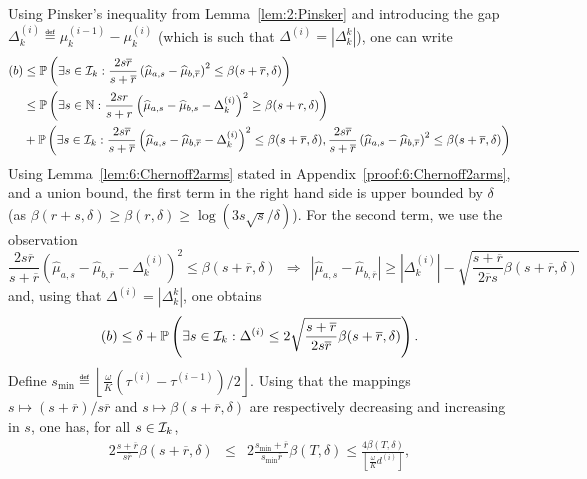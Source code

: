Using Pinsker's inequality from Lemma~\ref{lem:2:Pinsker} and introducing the gap $\Delta_k^{(i)} \eqdef \mu_k^{(i-1)} - {\mu}_k^{(i)}$ (which is such that $\Delta^{(i)} = |\Delta_k^k|$), one can write
%
\begin{align}
    (b) & \leq \mathbb{P}\left(\exists s \in \mathcal{I}_k : \frac{2s\overline{r}}{s+\overline{r}}\left(\widehat{\mu}_{a,s} - \widehat{\mu}_{b,\overline{r}} \right)^2  \leq \beta(s+\overline{r},\delta)\right)\nonumber\\
    & \leq \mathbb{P}\left(\exists s \in \mathbb{N} : \frac{2sr}{s+r}\left(\widehat{\mu}_{a,s} - \widehat{\mu}_{b,s} - \Delta_k^{(i)}\right)^2  \geq \beta(s+r,\delta)\right) \nonumber\\
    & + \mathbb{P}\left(\exists s \in \mathcal{I}_k : \frac{2s\overline{r}}{s+\overline{r}}\left(\widehat{\mu}_{a,s} - \widehat{\mu}_{b,\overline{r}} - \Delta_k^{(i)}\right)^2  \leq \beta(s+\overline{r},\delta), \frac{2s\overline{r}}{s+\overline{r}}\left(\widehat{\mu}_{a,s} - \widehat{\mu}_{b,\overline{r}}\right)^2  \leq \beta(s+\overline{r},\delta)\right) \nonumber
\end{align}
%
Using Lemma~\ref{lem:6:Chernoff2arms} stated in Appendix~\ref{proof:6:Chernoff2arms}, and a union bound, the first term in the right hand side is upper bounded by $\delta$ (as $\beta(r+s,\delta) \geq \beta(r,\delta) \geq \log(3s\sqrt{s}/\delta)$). For the second term, we use the observation
\[\frac{2s\overline{r}}{s+\overline{r}}\left(\widehat{\mu}_{a,s} - \widehat{\mu}_{b,\overline{r}} - \Delta_k^{(i)}\right)^2  \leq \beta(s+\overline{r},\delta) \ \ \Rightarrow \ \ |\widehat{\mu}_{a,s} - \widehat{\mu}_{b,\overline{r}}| \geq |\Delta_k^{(i)}| - \sqrt{\frac{s+\overline{r}}{2\overline{r}s}\beta(s+\overline{r},\delta)}\]
and, using that $\Delta^{(i)} = |\Delta_k^k|$, one obtains
%
\begin{equation}\label{eq:6:FromHereGlobal}
    (b) \leq \delta + \mathbb{P}\left(\exists s \in \mathcal{I}_k : \Delta^{(i)} \leq 2\sqrt{\frac{s+\overline{r}}{2s\overline{r}}\beta(s+\overline{r},\delta)}\right).
\end{equation}
%
Define $s_{\min} \eqdef \left\lfloor \frac{\omega}{K} (\tau^{(i)}-\tau^{(i-1)})/2\right\rfloor$. Using that the mappings $s \mapsto (s+\overline{r})/s\overline{r}$ and $s \mapsto \beta(s + \overline{r},\delta)$ are respectively decreasing and increasing in $s$, one has, for all $s\in \mathcal{I}_k$,
\begin{eqnarray*}
    2\frac{s+\overline{r}}{s\overline{r}}\beta\left(s+\overline{r}, \delta\right) & \leq &
    2\frac{s_{\min}+\overline{r}}{s_{\min}\overline{r}}\beta\left(T, \delta\right) \leq \frac{4\beta(T,\delta)}{\left\lfloor \frac{\omega}{K}d^{(i)}\right\rfloor},
\end{eqnarray*}
